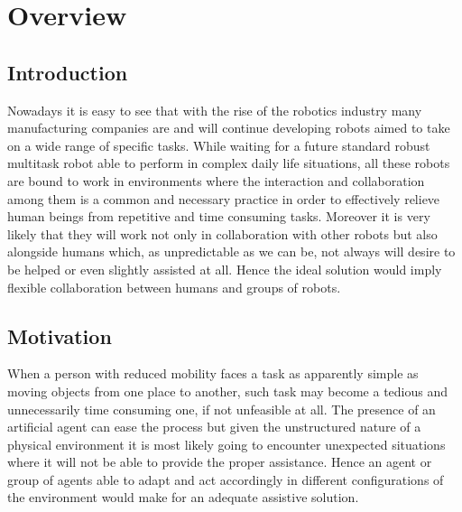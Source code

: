 
\chapter{Overview}



\section{Introduction}
Nowadays it is easy to see that with the rise of the robotics industry many manufacturing companies are and will continue developing robots aimed to take on a wide range of specific tasks. While waiting for a future standard robust multitask robot able to perform in complex daily life situations, all these robots are bound to work in environments where the interaction and collaboration among them is a common and necessary practice in order to effectively relieve human beings from repetitive and time consuming tasks.
Moreover it is very likely that they will work not only in collaboration with other robots but also alongside humans which, as unpredictable as we can be, not always will desire to be helped or even slightly assisted at all. Hence the ideal solution would imply flexible collaboration between humans and groups of robots.

\section{Motivation}
When a person with reduced mobility faces a task as apparently simple as moving objects from one place to another, such task may become a tedious and unnecessarily time consuming one, if not unfeasible at all. The presence of an artificial agent can ease the process but given the unstructured nature of a physical environment it is most likely going to encounter unexpected situations where it will not be able to provide the proper assistance. Hence an agent or group of agents able to adapt and act accordingly in different configurations of the environment would make for an adequate assistive solution.


